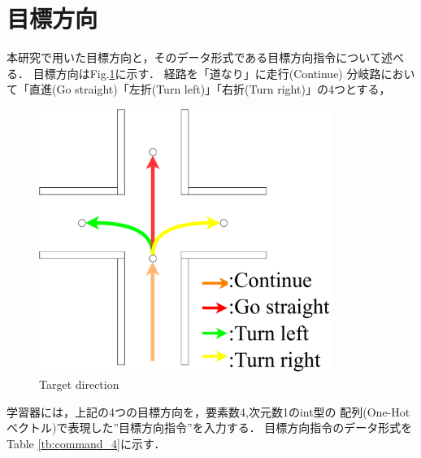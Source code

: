 \newpage
\section{目標方向}
本研究で用いた目標方向と，そのデータ形式である目標方向指令について述べる．
目標方向はFig.\ref{fig::cmd_4}に示す．
経路を「道なり」に走行(Continue)
分岐路において「直進(Go straight)「左折(Turn left)」「右折(Turn right)」の4つとする，
\begin{figure}[h]
  \centering
  \includegraphics[width = 9.5cm]{./figs/cmd_4.pdf}
  \caption{Target direction}
  \label{fig::cmd_4}
\end{figure}

学習器には，上記の4つの目標方向を，要素数4,次元数1のint型の
配列(One-Hot ベクトル)で表現した”目標方向指令”を入力する．
目標方向指令のデータ形式をTable \ref{tb:command_4}に示す．


